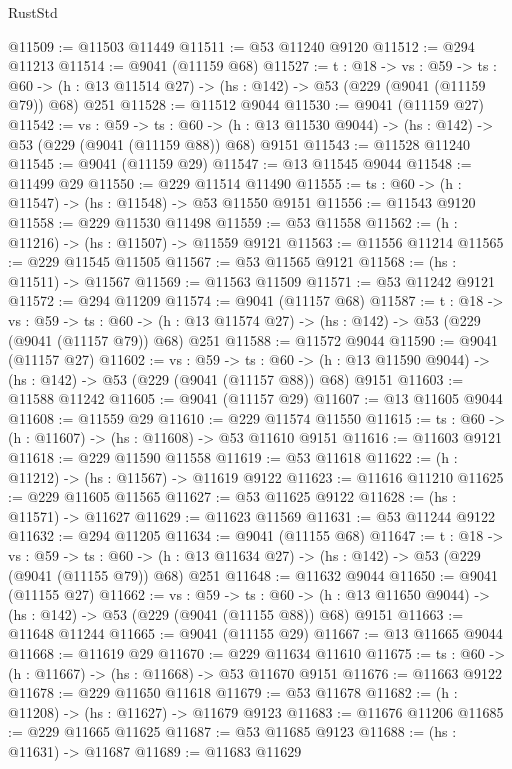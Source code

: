 \begin{lexlean}{RustStd}
\begin{coremodule}
@11509 := @11503 @11449
@11511 := @53 @11240 @9120
@11512 := @294 @11213
@11514 := @9041 (@11159 @68)
@11527 := {t : @18} ->
  {vs : @59} ->
  {ts : @60} -> (h : @13 @11514 @27) -> (hs : @142) -> @53 (@229 (@9041 (@11159 @79)) @68) @251
@11528 := @11512 @9044
@11530 := @9041 (@11159 @27)
@11542 := {vs : @59} ->
  {ts : @60} -> (h : @13 @11530 @9044) -> (hs : @142) -> @53 (@229 (@9041 (@11159 @88)) @68) @9151
@11543 := @11528 @11240
@11545 := @9041 (@11159 @29)
@11547 := @13 @11545 @9044
@11548 := @11499 @29
@11550 := @229 @11514 @11490
@11555 := {ts : @60} -> (h : @11547) -> (hs : @11548) -> @53 @11550 @9151
@11556 := @11543 @9120
@11558 := @229 @11530 @11498
@11559 := @53 @11558
@11562 := (h : @11216) -> (hs : @11507) -> @11559 @9121
@11563 := @11556 @11214
@11565 := @229 @11545 @11505
@11567 := @53 @11565 @9121
@11568 := (hs : @11511) -> @11567
@11569 := @11563 @11509
@11571 := @53 @11242 @9121
@11572 := @294 @11209
@11574 := @9041 (@11157 @68)
@11587 := {t : @18} ->
  {vs : @59} ->
  {ts : @60} -> (h : @13 @11574 @27) -> (hs : @142) -> @53 (@229 (@9041 (@11157 @79)) @68) @251
@11588 := @11572 @9044
@11590 := @9041 (@11157 @27)
@11602 := {vs : @59} ->
  {ts : @60} -> (h : @13 @11590 @9044) -> (hs : @142) -> @53 (@229 (@9041 (@11157 @88)) @68) @9151
@11603 := @11588 @11242
@11605 := @9041 (@11157 @29)
@11607 := @13 @11605 @9044
@11608 := @11559 @29
@11610 := @229 @11574 @11550
@11615 := {ts : @60} -> (h : @11607) -> (hs : @11608) -> @53 @11610 @9151
@11616 := @11603 @9121
@11618 := @229 @11590 @11558
@11619 := @53 @11618
@11622 := (h : @11212) -> (hs : @11567) -> @11619 @9122
@11623 := @11616 @11210
@11625 := @229 @11605 @11565
@11627 := @53 @11625 @9122
@11628 := (hs : @11571) -> @11627
@11629 := @11623 @11569
@11631 := @53 @11244 @9122
@11632 := @294 @11205
@11634 := @9041 (@11155 @68)
@11647 := {t : @18} ->
  {vs : @59} ->
  {ts : @60} -> (h : @13 @11634 @27) -> (hs : @142) -> @53 (@229 (@9041 (@11155 @79)) @68) @251
@11648 := @11632 @9044
@11650 := @9041 (@11155 @27)
@11662 := {vs : @59} ->
  {ts : @60} -> (h : @13 @11650 @9044) -> (hs : @142) -> @53 (@229 (@9041 (@11155 @88)) @68) @9151
@11663 := @11648 @11244
@11665 := @9041 (@11155 @29)
@11667 := @13 @11665 @9044
@11668 := @11619 @29
@11670 := @229 @11634 @11610
@11675 := {ts : @60} -> (h : @11667) -> (hs : @11668) -> @53 @11670 @9151
@11676 := @11663 @9122
@11678 := @229 @11650 @11618
@11679 := @53 @11678
@11682 := (h : @11208) -> (hs : @11627) -> @11679 @9123
@11683 := @11676 @11206
@11685 := @229 @11665 @11625
@11687 := @53 @11685 @9123
@11688 := (hs : @11631) -> @11687
@11689 := @11683 @11629

\end{coremodule}
\end{lexlean}
